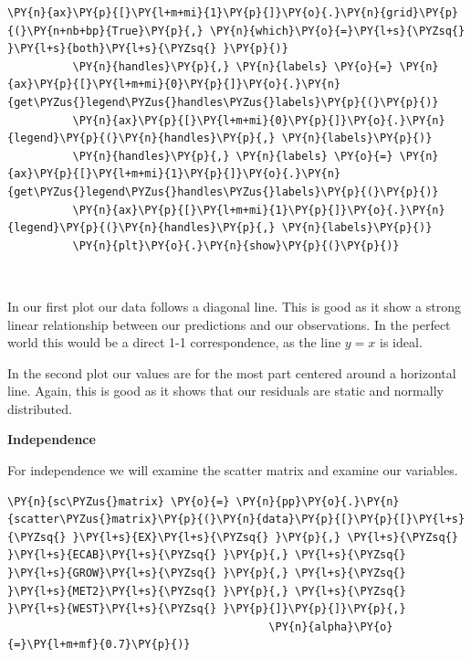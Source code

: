 \documentclass[10pt]{article}\usepackage[]{graphicx}\usepackage[]{xcolor}
\begin{document}
\begin{Verbatim}[commandchars=\\\{\}]
          \PY{n}{ax}\PY{p}{[}\PY{l+m+mi}{1}\PY{p}{]}\PY{o}{.}\PY{n}{grid}\PY{p}{(}\PY{n+nb+bp}{True}\PY{p}{,} \PY{n}{which}\PY{o}{=}\PY{l+s}{\PYZsq{} }\PY{l+s}{both}\PY{l+s}{\PYZsq{} }\PY{p}{)}
          \PY{n}{handles}\PY{p}{,} \PY{n}{labels} \PY{o}{=} \PY{n}{ax}\PY{p}{[}\PY{l+m+mi}{0}\PY{p}{]}\PY{o}{.}\PY{n}{get\PYZus{}legend\PYZus{}handles\PYZus{}labels}\PY{p}{(}\PY{p}{)}
          \PY{n}{ax}\PY{p}{[}\PY{l+m+mi}{0}\PY{p}{]}\PY{o}{.}\PY{n}{legend}\PY{p}{(}\PY{n}{handles}\PY{p}{,} \PY{n}{labels}\PY{p}{)}
          \PY{n}{handles}\PY{p}{,} \PY{n}{labels} \PY{o}{=} \PY{n}{ax}\PY{p}{[}\PY{l+m+mi}{1}\PY{p}{]}\PY{o}{.}\PY{n}{get\PYZus{}legend\PYZus{}handles\PYZus{}labels}\PY{p}{(}\PY{p}{)}
          \PY{n}{ax}\PY{p}{[}\PY{l+m+mi}{1}\PY{p}{]}\PY{o}{.}\PY{n}{legend}\PY{p}{(}\PY{n}{handles}\PY{p}{,} \PY{n}{labels}\PY{p}{)}
          \PY{n}{plt}\PY{o}{.}\PY{n}{show}\PY{p}{(}\PY{p}{)}
\end{Verbatim}

    \begin{center}
    \end{center}
    { \hspace*{\fill} \\}
    
    In our first plot our data follows a diagonal line. This is good as it
show a strong linear relationship between our predictions and our
observations. In the perfect world this would be a direct 1-1
correspondence, as the line $y=x$ is ideal.

In the second plot our values are for the most part centered around a
horizontal line. Again, this is good as it shows that our residuals are
static and normally distributed.

\textbf{Independence}

For independence we will examine the scatter matrix and examine our
variables.

    \begin{Verbatim}[commandchars=\\\{\}]
 \PY{n}{sc\PYZus{}matrix} \PY{o}{=} \PY{n}{pp}\PY{o}{.}\PY{n}{scatter\PYZus{}matrix}\PY{p}{(}\PY{n}{data}\PY{p}{[}\PY{p}{[}\PY{l+s}{\PYZsq{} }\PY{l+s}{EX}\PY{l+s}{\PYZsq{} }\PY{p}{,} \PY{l+s}{\PYZsq{} }\PY{l+s}{ECAB}\PY{l+s}{\PYZsq{} }\PY{p}{,} \PY{l+s}{\PYZsq{} }\PY{l+s}{GROW}\PY{l+s}{\PYZsq{} }\PY{p}{,} \PY{l+s}{\PYZsq{} }\PY{l+s}{MET2}\PY{l+s}{\PYZsq{} }\PY{p}{,} \PY{l+s}{\PYZsq{} }\PY{l+s}{WEST}\PY{l+s}{\PYZsq{} }\PY{p}{]}\PY{p}{]}\PY{p}{,}
                                        \PY{n}{alpha}\PY{o}{=}\PY{l+m+mf}{0.7}\PY{p}{)}
\end{Verbatim}
\end{document}
